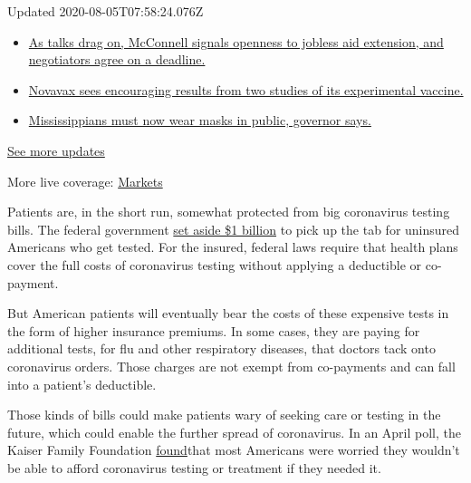 Updated 2020-08-05T07:58:24.076Z

\begin{itemize}
\tightlist
\item
  \href{https://www.nytimes.com/2020/08/04/world/coronavirus-cases.html?action=click\&pgtype=Article\&state=default\&region=MAIN_CONTENT_1\&context=storylines_live_updates\#link-762df92}{As
  talks drag on, McConnell signals openness to jobless aid extension,
  and negotiators agree on a deadline.}
\item
  \href{https://www.nytimes.com/2020/08/04/world/coronavirus-cases.html?action=click\&pgtype=Article\&state=default\&region=MAIN_CONTENT_1\&context=storylines_live_updates\#link-1228a480}{Novavax
  sees encouraging results from two studies of its experimental
  vaccine.}
\item
  \href{https://www.nytimes.com/2020/08/04/world/coronavirus-cases.html?action=click\&pgtype=Article\&state=default\&region=MAIN_CONTENT_1\&context=storylines_live_updates\#link-794484ed}{Mississippians
  must now wear masks in public, governor says.}
\end{itemize}

\href{https://www.nytimes.com/2020/08/04/world/coronavirus-cases.html?action=click\&pgtype=Article\&state=default\&region=MAIN_CONTENT_1\&context=storylines_live_updates}{See
more updates}

More live coverage:
\href{https://www.nytimes.com/live/2020/08/04/business/stock-market-today-coronavirus?action=click\&pgtype=Article\&state=default\&region=MAIN_CONTENT_1\&context=storylines_live_updates}{Markets}

Patients are, in the short run, somewhat protected from big coronavirus
testing bills. The federal government
\href{https://www.hrsa.gov/CovidUninsuredClaim}{set aside \$1 billion}
to pick up the tab for uninsured Americans who get tested. For the
insured, federal laws require that health plans cover the full costs of
coronavirus testing without applying a deductible or co-payment.

But American patients will eventually bear the costs of these expensive
tests in the form of higher insurance premiums. In some cases, they are
paying for additional tests, for flu and other respiratory diseases,
that doctors tack onto coronavirus orders. Those charges are not exempt
from co-payments and can fall into a patient's deductible.

Those kinds of bills could make patients wary of seeking care or testing
in the future, which could enable the further spread of coronavirus. In
an April poll, the Kaiser Family Foundation
\href{https://www.kff.org/coronavirus-covid-19/report/kff-health-tracking-poll-early-april-2020/}{found}that
most Americans were worried they wouldn't be able to afford coronavirus
testing or treatment if they needed it.

